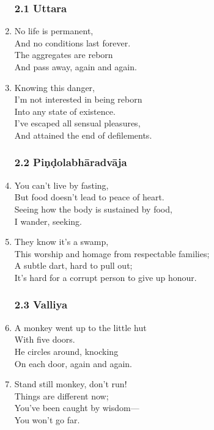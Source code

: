 \documentclass[10pt, openany]{book}
\begin{document}
\begin{enumerate}
\subsubsection*{2.1 Uttara}

\item No life is permanent,\\
And no conditions last forever.\\
The aggregates are reborn\\
And pass away, again and again.

\item Knowing this danger,\\
I’m not interested in being reborn \\
Into any state of existence.\\
I’ve escaped all sensual pleasures,\\
And attained the end of defilements.

\subsubsection*{2.2 Piṇḍolabhāradvāja}

\item You can’t live by fasting,\\
But food doesn’t lead to peace of heart.\\
Seeing how the body is sustained by food,\\
I wander, seeking.

\item They know it’s a swamp,\\
This worship and homage from respectable families;\\
A subtle dart, hard to pull out;\\
It’s hard for a corrupt person to give up honour.

\subsubsection*{2.3 Valliya}

\item A monkey went up to the little hut\\
With five doors.\\
He circles around, knocking\\
On each door, again and again.

\item Stand still monkey, don’t run!\\
Things are different now;\\
You’ve been caught by wisdom—\\
You won’t go far.


\end{enumerate}
\end{document}
